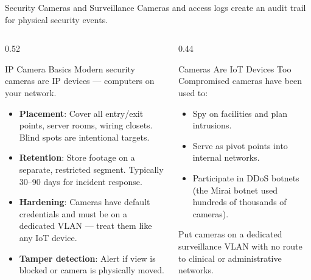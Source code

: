 \documentclass[aspectratio=169]{beamer}  %
\begin{document}
\begin{frame}{Security Cameras and Surveillance}
    \footnotesize
    Cameras and access logs create an audit trail for physical security events.

    \vspace{0.3em}
    \begin{columns}[T]
        \begin{column}{0.52\textwidth}
            \begin{block}{IP Camera Basics}
                \footnotesize
                Modern security cameras are IP devices --- computers on your network.
                \begin{itemize}
                    \item \textbf{Placement}: Cover all entry/exit points, server rooms, wiring closets. Blind spots are intentional targets.
                    \item \textbf{Retention}: Store footage on a separate, restricted segment. Typically 30--90 days for incident response.
                    \item \textbf{Hardening}: Cameras have default credentials and must be on a dedicated VLAN --- treat them like any IoT device.
                    \item \textbf{Tamper detection}: Alert if view is blocked or camera is physically moved.
                \end{itemize}
            \end{block}
        \end{column}
        \begin{column}{0.44\textwidth}
            \begin{alertblock}{Cameras Are IoT Devices Too}
                \footnotesize
                Compromised cameras have been used to:
                \begin{itemize}
                    \item Spy on facilities and plan intrusions.
                    \item Serve as pivot points into internal networks.
                    \item Participate in DDoS botnets (the Mirai botnet used hundreds of thousands of cameras).
                \end{itemize}
                Put cameras on a dedicated surveillance VLAN with no route to clinical or administrative networks.
            \end{alertblock}
        \end{column}
    \end{columns}
\end{frame}
\end{document}
